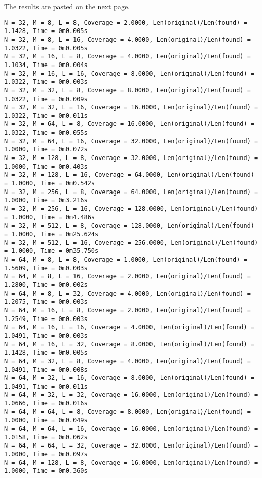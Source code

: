 \documentclass{article}
\begin{document}
The results are pasted on the next page. 
\clearpage
{\small
\begin{verbatim}
N = 32, M = 8, L = 8, Coverage = 2.0000, Len(original)/Len(found) = 1.1428, Time = 0m0.005s
N = 32, M = 8, L = 16, Coverage = 4.0000, Len(original)/Len(found) = 1.0322, Time = 0m0.005s
N = 32, M = 16, L = 8, Coverage = 4.0000, Len(original)/Len(found) = 1.1034, Time = 0m0.004s
N = 32, M = 16, L = 16, Coverage = 8.0000, Len(original)/Len(found) = 1.0322, Time = 0m0.003s
N = 32, M = 32, L = 8, Coverage = 8.0000, Len(original)/Len(found) = 1.0322, Time = 0m0.009s
N = 32, M = 32, L = 16, Coverage = 16.0000, Len(original)/Len(found) = 1.0322, Time = 0m0.011s
N = 32, M = 64, L = 8, Coverage = 16.0000, Len(original)/Len(found) = 1.0322, Time = 0m0.055s
N = 32, M = 64, L = 16, Coverage = 32.0000, Len(original)/Len(found) = 1.0000, Time = 0m0.072s
N = 32, M = 128, L = 8, Coverage = 32.0000, Len(original)/Len(found) = 1.0000, Time = 0m0.403s
N = 32, M = 128, L = 16, Coverage = 64.0000, Len(original)/Len(found) = 1.0000, Time = 0m0.542s
N = 32, M = 256, L = 8, Coverage = 64.0000, Len(original)/Len(found) = 1.0000, Time = 0m3.216s
N = 32, M = 256, L = 16, Coverage = 128.0000, Len(original)/Len(found) = 1.0000, Time = 0m4.486s
N = 32, M = 512, L = 8, Coverage = 128.0000, Len(original)/Len(found) = 1.0000, Time = 0m25.624s
N = 32, M = 512, L = 16, Coverage = 256.0000, Len(original)/Len(found) = 1.0000, Time = 0m35.750s
N = 64, M = 8, L = 8, Coverage = 1.0000, Len(original)/Len(found) = 1.5609, Time = 0m0.003s
N = 64, M = 8, L = 16, Coverage = 2.0000, Len(original)/Len(found) = 1.2800, Time = 0m0.002s
N = 64, M = 8, L = 32, Coverage = 4.0000, Len(original)/Len(found) = 1.2075, Time = 0m0.003s
N = 64, M = 16, L = 8, Coverage = 2.0000, Len(original)/Len(found) = 1.2549, Time = 0m0.003s
N = 64, M = 16, L = 16, Coverage = 4.0000, Len(original)/Len(found) = 1.0491, Time = 0m0.003s
N = 64, M = 16, L = 32, Coverage = 8.0000, Len(original)/Len(found) = 1.1428, Time = 0m0.005s
N = 64, M = 32, L = 8, Coverage = 4.0000, Len(original)/Len(found) = 1.0491, Time = 0m0.008s
N = 64, M = 32, L = 16, Coverage = 8.0000, Len(original)/Len(found) = 1.0491, Time = 0m0.011s
N = 64, M = 32, L = 32, Coverage = 16.0000, Len(original)/Len(found) = 1.0666, Time = 0m0.016s
N = 64, M = 64, L = 8, Coverage = 8.0000, Len(original)/Len(found) = 1.0000, Time = 0m0.049s
N = 64, M = 64, L = 16, Coverage = 16.0000, Len(original)/Len(found) = 1.0158, Time = 0m0.062s
N = 64, M = 64, L = 32, Coverage = 32.0000, Len(original)/Len(found) = 1.0000, Time = 0m0.097s
N = 64, M = 128, L = 8, Coverage = 16.0000, Len(original)/Len(found) = 1.0000, Time = 0m0.360s

\end{verbatim}}
\end{document}
